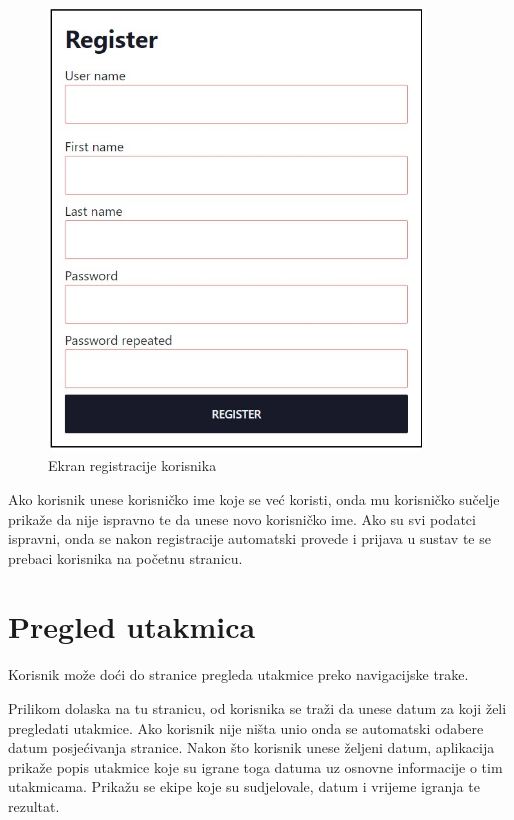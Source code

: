 \documentclass[times, utf8, zavrsni]{fer}
\begin{document}
\begin{figure}[htb]
\centering
\includegraphics[width=10cm]{images/register.jpg}
\caption{Ekran registracije korisnika}
\label{fig:register}
\end{figure}

Ako korisnik unese korisničko ime koje se već koristi, onda mu korisničko sučelje prikaže da nije ispravno te da unese novo korisničko ime.
Ako su svi podatci ispravni, onda se nakon registracije automatski provede i prijava u sustav te se prebaci korisnika na početnu stranicu.

\section{Pregled utakmica}

Korisnik može doći do stranice pregleda utakmice preko navigacijske trake.

Prilikom dolaska na tu stranicu, od korisnika se traži da unese datum za koji želi pregledati utakmice. Ako korisnik nije ništa unio onda se automatski odabere datum posjećivanja stranice.
Nakon što korisnik unese željeni datum, aplikacija prikaže popis utakmice koje su igrane toga datuma uz osnovne informacije o tim utakmicama. Prikažu se ekipe koje su sudjelovale, datum i vrijeme igranja te rezultat.
\end{document}
